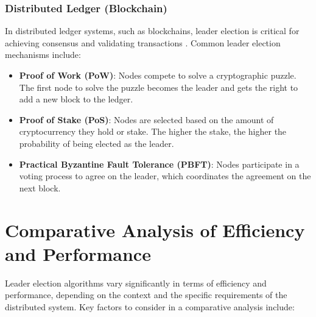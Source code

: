 \subsubsection{Distributed Ledger (Blockchain)}
In distributed ledger systems, such as blockchains, leader election is critical for achieving consensus and validating transactions \cite{Ref5}. Common leader election mechanisms include:

\begin{itemize}
    \item \textbf{Proof of Work (PoW)}: Nodes compete to solve a cryptographic puzzle. The first node to solve the puzzle becomes the leader and gets the right to add a new block to the ledger.
    \item \textbf{Proof of Stake (PoS)}: Nodes are selected based on the amount of cryptocurrency they hold or stake. The higher the stake, the higher the probability of being elected as the leader.
    \item \textbf{Practical Byzantine Fault Tolerance (PBFT)}: Nodes participate in a voting process to agree on the leader, which coordinates the agreement on the next block.
\end{itemize}

\section{Comparative Analysis of Efficiency and Performance}
Leader election algorithms vary significantly in terms of efficiency and performance, depending on the context and the specific requirements of the distributed system. Key factors to consider in a comparative analysis include:

